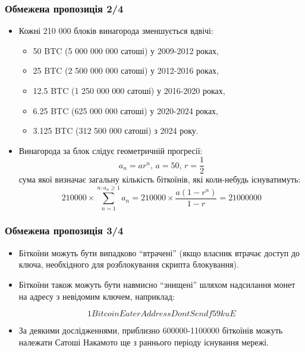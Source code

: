 \documentclass{beamer}
\begin{document}
\begin{frame}
  \frametitle{Обмежена пропозиція 2/4}
  \begin{itemize}
  \item Кожні 210 000 блоків винагорода зменшується вдвічі:
    \begin{itemize}
    \item 50 BTC (5 000 000 000 сатоші) у 2009-2012 роках,
    \item 25 BTC (2 500 000 000 сатоші) у 2012-2016 роках,
    \item 12.5 BTC (1 250 000 000 сатоші) у 2016-2020 роках,
    \item 6.25 BTC (625 000 000 сатоші) у 2020-2024 роках,
    \item 3.125 BTC (312 500 000 сатоші) з 2024 року.
    \end{itemize}
  \item Винагорода за блок слідує геометричній прогресії:
    $$a_n = ar^n \text{, } a = 50 \text{, } r = \frac{1}{2}$$
    сума якої визначає загальну кількість біткоїнів, які коли-небудь
    існуватимуть:
    $$210000 \times \sum_{n = 1}^{n: a_n \geq 1} a_n = 210000 \times \frac{a(1 -
      r^n)}{1 - r} = 21000000$$
  \end{itemize}
\end{frame}

\begin{frame}
  \frametitle{Обмежена пропозиція 3/4}
  \begin{itemize}
  \item Біткоїни можуть бути випадково ``втрачені'' (якщо власник втрачає доступ
    до ключа, необхідного для розблокування скрипта блокування).
  \item Біткоїни також можуть бути навмисно ``знищені'' шляхом надсилання монет
    на адресу з невідомим ключем, наприклад:
    \begin{small}
      $$1BitcoinEaterAddressDontSendf59kuE$$
    \end{small}
  \item За деякими дослідженнями, приблизно 600000-1100000 біткоїнів можуть
    належати Сатоші Накамото ще з раннього періоду існування мережі.
  \end{itemize}
\end{frame}
\end{document}
